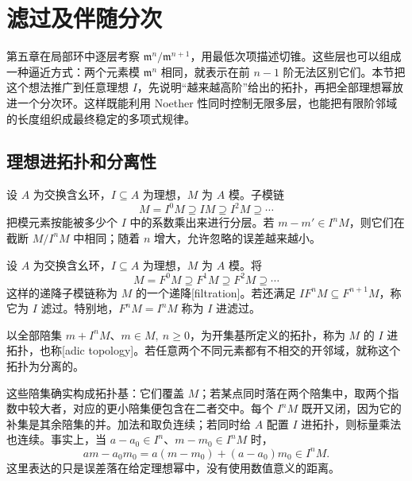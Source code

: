 
% 
% 

\section{滤过及伴随分次}
\label{g5:sec:0701}

第五章在局部环中逐层考察 \(\mathfrak m^n/\mathfrak m^{n+1}\)，用最低次项描述切锥。这些层也可以组成一种逼近方式：两个元素模 \(\mathfrak m^n\) 相同，就表示在前 \(n-1\) 阶无法区别它们。本节把这个想法推广到任意理想 \(I\)，先说明“越来越高阶”给出的拓扑，再把全部理想幂放进一个分次环。这样既能利用 Noether 性同时控制无限多层，也能把有限阶邻域的长度组织成最终稳定的多项式规律。

\subsection{理想进拓扑和分离性}
\label{g5:subsec:0701:01}

设 \(A\) 为交换含幺环，\(I\subseteq A\) 为理想，\(M\) 为 \(A\) 模。子模链
\[
	M=I^0M\supseteq IM\supseteq I^2M\supseteq\cdots
\]
把模元素按能被多少个 \(I\) 中的系数乘出来进行分层。若 \(m-m'\in I^nM\)，则它们在截断 \(M/I^nM\) 中相同；随着 \(n\) 增大，允许忽略的误差越来越小。

\begin{definition}\label{g5:def:adic-topology}
	设 \(A\) 为交换含幺环，\(I\subseteq A\) 为理想，\(M\) 为 \(A\) 模。将
	\[
		M=F^0M\supseteq F^1M\supseteq F^2M\supseteq\cdots
	\]
	这样的递降子模链称为 \(M\) 的一个递降[filtration]。若还满足 \(IF^nM\subseteq F^{n+1}M\)，称它为 \(I\) 滤过。特别地，\(F^nM=I^nM\) 称为 \(I\) 进滤过。

	以全部陪集 \(m+I^nM\)、\(m\in M,\ n\geq0\)，为开集基所定义的拓扑，称为 \(M\) 的 \(I\) 进拓扑，也称[adic topology]。若任意两个不同元素都有不相交的开邻域，就称这个拓扑为分离的。
\end{definition}

这些陪集确实构成拓扑基：它们覆盖 \(M\)；若某点同时落在两个陪集中，取两个指数中较大者，对应的更小陪集便包含在二者交中。每个 \(I^nM\) 既开又闭，因为它的补集是其余陪集的并。加法和取负连续；若同时给 \(A\) 配置 \(I\) 进拓扑，则标量乘法也连续。事实上，当 \(a-a_0\in I^n\)、\(m-m_0\in I^nM\) 时，
\[
	am-a_0m_0=a(m-m_0)+(a-a_0)m_0\in I^nM.
\]
这里表达的只是误差落在给定理想幂中，没有使用数值意义的距离。


